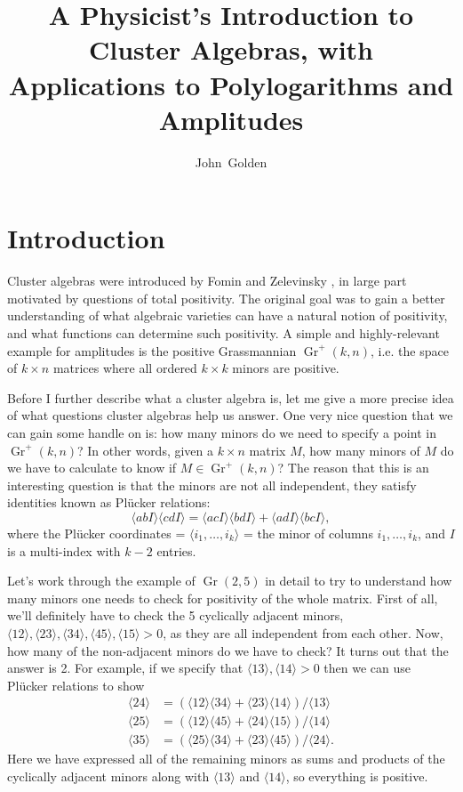 \documentclass[11pt]{article}
\title{A Physicist's Introduction to Cluster Algebras, with Applications to Polylogarithms and Amplitudes}
\author{John~Golden}
\affiliation{Leinweber  Center for Theoretical Physics and
Randall Laboratory of Physics, Department of Physics,
University of Michigan
Ann Arbor, MI 48109, USA}
\DeclareMathOperator{\Gr}{Gr}
\def\ket#1{\langle #1 \rangle}
\begin{document}
\maketitle

\section{Introduction}
Cluster algebras were introduced by Fomin and Zelevinsky \cite{1021.16017}, in large part motivated by questions of total positivity. The original goal was to gain a better understanding of what algebraic varieties can have a natural notion of positivity, and what functions can determine such positivity. A simple and highly-relevant example for amplitudes is the positive Grassmannian $\Gr^+(k,n)$, i.e. the space of $k\times n$ matrices where all ordered $k\times k$ minors are positive. 

Before I further describe what a cluster algebra is, let me give a more precise idea of what questions cluster algebras help us answer. One very nice question that we can gain some handle on is: how many minors do we need to specify a point in $\Gr^+(k,n)$? In other words, given a $k \times n$ matrix $M$, how many minors of $M$ do we have to calculate to know if $M \in \Gr^+(k,n)$? The reason that this is an interesting question is that the minors are not all independent, they satisfy identities known as Pl\"ucker relations:
\begin{equation}
  \label{eq:plucker-rel}
  \ket{abI} \ket{cdI} = \ket{acI} \ket{bdI} + \ket{adI}\ket{bcI},
\end{equation}
where the Pl\"ucker coordinates = $\ket{i_1,\ldots,i_k}$ = the minor of columns $i_1, \ldots,i_k$, and $I$ is a multi-index with $k-2$ entries.

Let's work through the example of $\Gr(2,5)$ in detail to try to understand how many minors one needs to check for positivity of the whole matrix. First of all, we'll definitely have to check the 5 cyclically adjacent minors, $\ket{12}, \ket{23}, \ket{34}, \ket{45}, \ket{15}> 0$, as they are all independent from each other. Now, how many of the non-adjacent minors do we have to check? It turns out that the answer is 2. For example, if we specify that $\ket{13}, \ket{14}>0$ then we can use Pl\"ucker relations to show
\begin{equation}
\begin{split}
	\ket{24} &= (\ket{12}\ket{34} + \ket{23}\ket{14})/\ket{13}\\
	\ket{25} &= (\ket{12}\ket{45} + \ket{24}\ket{15})/\ket{14}\\
	\ket{35} &= (\ket{25}\ket{34} + \ket{23}\ket{45})/\ket{24}.
\end{split}	 	
\end{equation} 
Here we have expressed all of the remaining minors as sums and products of the cyclically adjacent minors along with $\ket{13}$ and $\ket{14}$, so everything is positive. 
\end{document}
